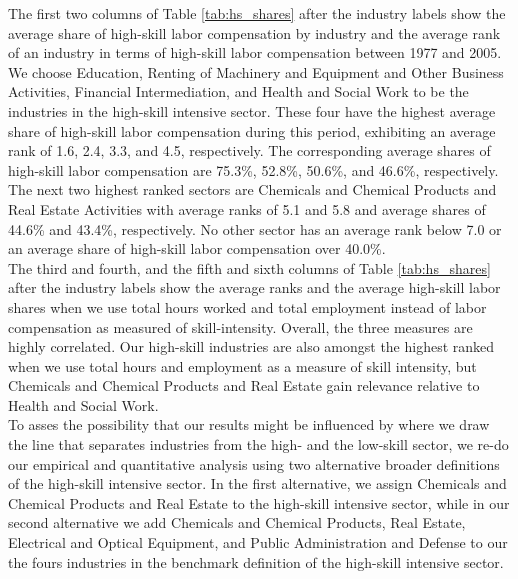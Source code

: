\documentclass[10pt]{article}
\begin{document}
The first two columns of Table \ref{tab:hs_shares} after the industry labels show the average share of high-skill labor compensation by industry and the average rank of an industry in terms of high-skill labor compensation between 1977 and 2005. We choose Education, Renting of Machinery and Equipment and Other Business Activities, Financial Intermediation, and Health and Social Work to be the industries in the high-skill intensive sector. These four have the highest average share of high-skill labor compensation during this period, exhibiting an average rank of 1.6, 2.4, 3.3, and 4.5, respectively. The corresponding average shares of high-skill labor compensation are 75.3\%, 52.8\%, 50.6\%, and 46.6\%, respectively. The next two highest ranked sectors are Chemicals and Chemical Products and Real Estate Activities with average ranks of 5.1 and 5.8 and average shares of 44.6\% and 43.4\%, respectively. No other sector has an average rank below 7.0 or an average share of high-skill labor compensation over 40.0\%.\\

The third and fourth, and the fifth and sixth columns of Table \ref{tab:hs_shares} after the industry labels show the average ranks and the average high-skill labor shares when we use total hours worked and total employment instead of labor compensation as measured of skill-intensity. Overall, the three measures are highly correlated. Our high-skill industries are also amongst the highest ranked when we use total hours and employment as a measure of skill intensity, but Chemicals and Chemical Products and Real Estate gain relevance relative to Health and Social Work.\\

To asses the possibility that our results might be influenced by where we draw the line that separates industries from the high- and the low-skill sector, we re-do our empirical and quantitative analysis using two alternative broader definitions of the high-skill intensive sector. In the first alternative, we assign Chemicals and Chemical Products and Real Estate to the high-skill intensive sector, while in our second alternative we add Chemicals and Chemical Products, Real Estate, Electrical and Optical Equipment, and Public Administration and Defense to our the fours industries in the benchmark definition of the high-skill intensive sector.\\
\end{document}
